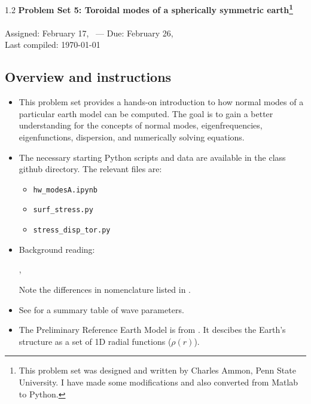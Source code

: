 \documentclass[11pt,titlepage,fleqn]{article}
\newcommand{\tfilemain}{{\tt hw\_modesA.ipynb}}
\newcommand{\tfiless}{{\tt surf\_stress.py}}
\newcommand{\tfilesdt}{{\tt stress\_disp\_tor.py}}
\begin{document}

\begin{spacing}{1.2}
\centering
{\large \bf Problem Set 5: Toroidal modes of a spherically symmetric earth\footnote{This problem set was designed and written by Charles Ammon, Penn State University. I have made some modifications and also converted from Matlab to Python.}} \\
\cltag\ \\
Assigned: February 17, \cyear\ --- Due: February 26, \cyear\ \\
Last compiled: \today \\
\end{spacing}


\subsection*{Overview and instructions}

\begin{itemize}

\item This problem set provides a hands-on introduction to how normal modes of a particular earth model can be computed. The goal is to gain a better understanding for the concepts of normal modes, eigenfrequencies, eigenfunctions, dispersion, and numerically solving equations.

\item The necessary starting Python scripts and data are available in the class github directory. The relevant files are:
%
\begin{itemize}
\item \tfilemain\
\item \tfiless\
\item \tfilesdt\
\end{itemize}

\item Background reading:

\citet[][Section 2.9]{SteinWysession}, \citet[][Ch.~8]{DT}

Note the differences in nomenclature listed in .

\item See  for a summary table of wave parameters.

\item The Preliminary Reference Earth Model is from \citet{PREM}. It descibes the Earth's structure as a set of 1D radial functions (\eg $\rho(r)$).

\end{itemize}
\end{document}
